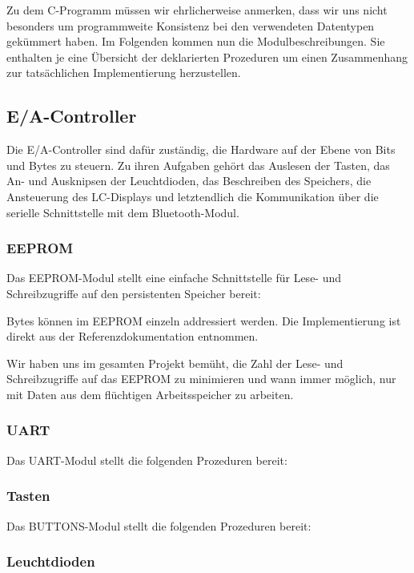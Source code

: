 \documentclass[ngerman]{article}
\begin{document}
Zu dem C-Programm müssen wir ehrlicherweise anmerken, dass wir uns nicht besonders
um programmweite Konsistenz bei den verwendeten Datentypen gekümmert haben. Im Folgenden
kommen nun die Modulbeschreibungen. Sie enthalten je eine Übersicht der deklarierten
Prozeduren um einen Zusammenhang zur tatsächlichen Implementierung herzustellen.

\subsection{E/A-Controller}

Die E/A-Controller sind dafür zuständig, die Hardware auf der Ebene von Bits und Bytes zu
steuern. Zu ihren Aufgaben gehört das Auslesen der Tasten, das An-
und Ausknipsen der Leuchtdioden,  das Beschreiben des Speichers,
die Ansteuerung des LC-Displays und letztendlich die Kommunikation über
die serielle Schnittstelle mit dem Bluetooth-Modul.

\subsubsection{EEPROM}

Das EEPROM-Modul stellt eine einfache Schnittstelle für Lese- und Schreibzugriffe
auf den persistenten Speicher bereit: 


Bytes können im EEPROM einzeln addressiert werden. Die Implementierung ist direkt
aus der Referenzdokumentation entnommen.

Wir haben uns im gesamten Projekt bemüht, die Zahl der Lese- und
Schreibzugriffe auf das EEPROM zu minimieren und wann immer möglich,
nur mit Daten aus dem flüchtigen Arbeitsspeicher zu
arbeiten.

\subsubsection{UART}

Das UART-Modul stellt die folgenden Prozeduren bereit:



\subsubsection{Tasten}

Das BUTTONS-Modul stellt die folgenden Prozeduren bereit:



\subsubsection{Leuchtdioden}
\end{document}
